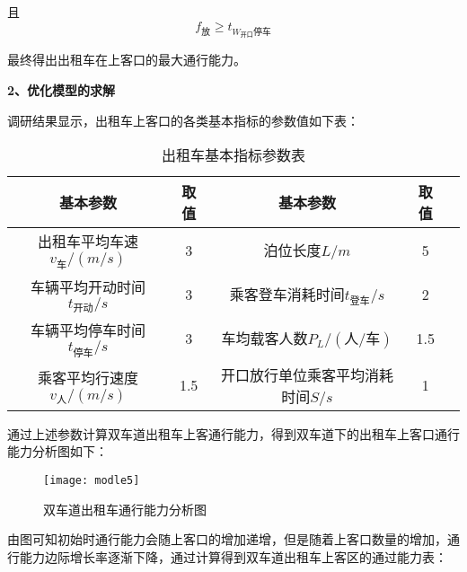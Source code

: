 \documentclass[withoutpreface,bwprint]{cumcmthesis} %
\begin{document}
且
$$
f_{\text{放}} \geqslant t_{{W}_{\text{开口}} \text{停车}}
$$

最终得出出租车在上客口的最大通行能力。

\textbf{2、优化模型的求解}

调研结果显示，出租车上客口的各类基本指标的参数值如下表：
\begin{table}[!htbp]
	\caption{出租车基本指标参数表}\label{tab:008} \centering
	\begin{tabular}{ccccc}
		\toprule[2pt]
		基本参数 & 取值 & 基本参数 & 取值\\
		\midrule[1pt]
		出租车平均车速$v_{\text{车}}/(m/s)$ & 3	& 泊位长度$L/m$ & 5\\
		车辆平均开动时间$t_{\text{开动}}/s$ & 3 & 乘客登车消耗时间$t_{\text{登车}}/s$ & 2\\
	    车辆平均停车时间$t_{\text{停车}}/s$ & 3 &
	    车均载客人数$P_L/({\text{人}}/{\text{车}})$ & 1.5\\
		乘客平均行速度$v_{\text{人}}/(m/s)$ & 1.5 & 开口放行单位乘客平均消耗时间$S/s$ & 1\\
		\bottomrule[1.5pt]
	\end{tabular}
\end{table}
\newpage
通过上述参数计算双车道出租车上客通行能力，得到双车道下的出租车上客口通行能力分析图如下：
\begin{figure}[!htbp]
	\centering
	\texttt{[image: modle5]}
	\caption{双车道出租车通行能力分析图}
	\label{fig:circuit-diagram}
\end{figure}

由图可知初始时通行能力会随上客口的增加递增，但是随着上客口数量的增加，通行能力边际增长率逐渐下降，通过计算得到双车道出租车上客区的通过能力表：
\end{document}
